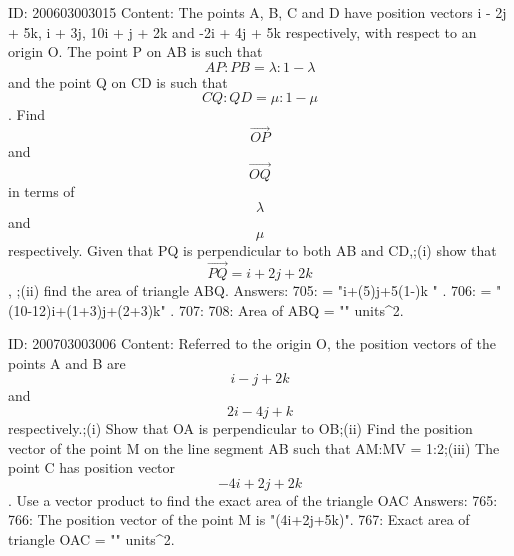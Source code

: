 \documentclass{article}
\begin{document}
ID: 200603003015
Content:
The points A, B, C and D have position vectors i - 2j + 5k, i + 3j, 10i + j + 2k and -2i + 4j + 5k respectively, with respect to an origin O. The point P on AB is such that $$AP:PB= \lambda :1- \lambda $$ and the point Q on CD is such that $$CQ:QD= \mu :1- \mu $$. Find $$ \vec {OP}$$ and $$ \vec {OQ}$$ in terms of $$\lambda$$ and $$\mu$$ respectively. Given that PQ is perpendicular to both AB and CD,;(i) show that $$ \vec {PQ} =i+2j+2k$$, ;(ii) find the area of triangle ABQ. Answers:
705:   = "i+(5)j+5(1-\lambda)k " .
706:  = "(10-12\mu)i+(1+3\mu)j+(2+3\mu)k" .
707: 
708: Area of \Delta ABQ = "" units^2.

ID: 200703003006
Content:
Referred to the origin O, the position vectors of the points A and B are $$i -j +2k$$ and $$2i - 4j +k$$ respectively.;(i) Show that OA is perpendicular to OB;(ii) Find the position vector of the point M on the line segment AB such that AM:MV = 1:2;(iii) The point C has position vector $$-4i + 2j + 2k$$. Use a vector product to find the exact area of the triangle OAC Answers:
765: 
766: The position vector of the point M is "(4i+2j+5k)".
767: Exact area of triangle OAC = "" units^2.
\end{document}

